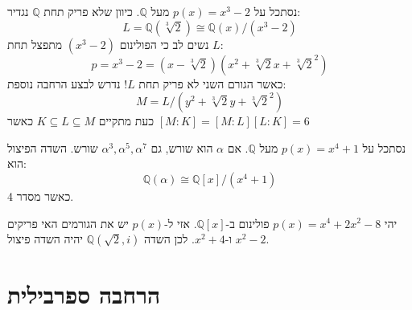 \documentclass{tstextbook}
\begin{document}
\begin{example}
נסתכל על \(p(x)=x^3 - 2\) מעל \(\mathbb{Q}\). כיוון שלא פריק תחת \(\mathbb{Q}\) נגדיר:
$$L=\mathbb{Q} \left( \sqrt[3]{ 2 } \right) \cong \mathbb{Q} (x) / (x^3 - 2)$$
נשים לב כי הפולינום \((x^3 - 2)\) מתפצל תחת \(L\):
$$p=x^3-2=\left( x-\sqrt[3]{ 2 } \right)\left( x^2+\sqrt[3]{ 2 } x+\sqrt[3]{ 2 }^2\right)$$
כאשר הגורם השני לא פריק תחת \(L\)! נדרש לבצע הרחבה נוספת:
$$M= L  /\left( y^2+\sqrt[3]{ 2 }y+\sqrt[3]{ 2 }^2 \right)$$
כעת מתקיים \(K\subseteq L \subseteq M\)
כאשר \([M:K]=[M:L][L:K]=6\)

\end{example}
\begin{example}
נסתכל על \(p(x)=x^4+1\) מעל \(\mathbb{Q}\). אם \(\alpha\) הוא שורש, גם \(\alpha^3,\alpha^5, \alpha^7\) שורש. השדה הפיצול הוא:
$$\mathbb{Q} \left( \alpha \right)\cong  \mathbb{Q} [x] / (x^4+1)$$
כאשר מסדר 4.

\end{example}
\begin{example}
יהי \(p(x)=x^4+2x^2-8\) פולינום ב-\(\mathbb{Q}[x]\). אזי ל-\(p(x)\) יש את הגורמים האי פריקים \(x^2-2\) ו-\(x^2+4\). לכן השדה \(\mathbb{Q}\left( \sqrt{ 2 },i \right)\) יהיה השדה פיצול.

\end{example}
\section{הרחבה ספרבילית}
\end{document}
